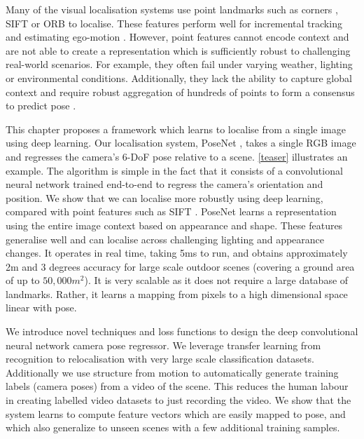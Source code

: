 Many of the visual localisation systems use point landmarks such as corners \citep{robertson2004image}, SIFT \citep{lowe2004distinctive} or ORB \citep{rublee2011orb} to localise. These features perform well for incremental tracking and estimating ego-motion \citep{mur2015orb}. However, point features cannot encode context and are not able to create a representation which is sufficiently robust to challenging real-world scenarios. For example, they often fail under varying weather, lighting or environmental conditions. Additionally, they lack the ability to capture global context and require robust aggregation of hundreds of points to form a consensus to predict pose \citep{zeisl2015camera}.





This chapter proposes a framework which learns to localise from a single image using deep learning. Our localisation system, PoseNet \citep{kendall2015posenet,kendall2015modelling,kendall2017posenet}, takes a single RGB image and regresses the camera's 6-DoF pose relative to a scene. \cref{teaser} illustrates an example. The algorithm is simple in the fact that it consists of a convolutional neural network trained end-to-end to regress the camera's orientation and position. We show that we can localise more robustly using deep learning, compared with point features such as SIFT \citep{lowe2004distinctive}. PoseNet learns a representation using the entire image context based on appearance and shape. These features generalise well and can localise across challenging lighting and appearance changes. It operates in real time, taking 5ms to run, and obtains approximately 2m and 3 degrees accuracy for large scale outdoor scenes (covering a ground area of up to $50,000m^2$). It is very scalable as it does not require a large database of landmarks. Rather, it learns a mapping from pixels to a high dimensional space linear with pose.

We introduce novel techniques and loss functions to design the deep convolutional neural network camera pose regressor. We leverage transfer learning from recognition to relocalisation with very large scale classification datasets. Additionally we use structure from motion to automatically generate training labels (camera poses) from a video of the scene. This reduces the human labour in creating labelled video datasets to just recording the video. We show that the system learns to compute feature vectors which are easily mapped to pose, and which also generalize to unseen scenes with a few additional training samples.

